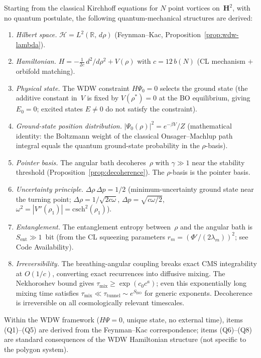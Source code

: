 \begin{derivation}
\label{thm:qm-from-polygons}
Starting from the classical Kirchhoff equations for
$N$ point vortices on~$\mathbf{H}^2$, with no quantum
postulate, the following quantum-mechanical structures
are derived:
\begin{enumerate}
\item[\textup{(Q1)}] \emph{Hilbert space.}
  $\mathcal{H} = L^2(\mathbb{R},\,d\rho)$
  (Feynman--Kac, Proposition~\ref{prop:wdw-lambda}).
\item[\textup{(Q2)}] \emph{Hamiltonian.}
  $H = -\tfrac{1}{2c}\,d^2/d\rho^2 + V(\rho)$
  with $c = 12\,b(N)$ (CL mechanism $+$ orbifold matching).
\item[\textup{(Q3)}] \emph{Physical state.}
  The WDW constraint $H\Psi_0 = 0$ selects the ground
  state (the additive constant in~$V$ is fixed by
  $V(\rho^*) = 0$ at the BO equilibrium, giving
  $E_0 = 0$; excited states $E \ne 0$ do not satisfy
  the constraint).
\item[\textup{(Q4)}] \emph{Ground-state position distribution.}
  $|\Psi_0(\rho)|^2 = e^{-\beta V}/Z$
  (mathematical identity: the Boltzmann weight of the
  classical Onsager--Machlup path integral equals the
  quantum ground-state probability in the $\rho$-basis).
\item[\textup{(Q5)}] \emph{Pointer basis.}
  The angular bath decoheres~$\rho$ with
  $\gamma \gg 1$ near the stability threshold
  (Proposition~\ref{prop:decoherence}).
  The $\rho$-basis is the pointer basis.
\item[\textup{(Q6)}] \emph{Uncertainty principle.}
  $\Delta\rho\,\Delta p = 1/2$ (minimum-uncertainty
  ground state near the turning point;
  $\Delta\rho = 1/\!\sqrt{2c\omega}$,
  $\Delta p = \sqrt{c\omega/2}$,
  $\omega^2 = |V''(\rho_1)| = \mathrm{csch}^2(\rho_1)$).
\item[\textup{(Q7)}] \emph{Entanglement.}
  The entanglement entropy between~$\rho$ and
  the angular bath is $S_{\mathrm{ent}} \gg 1$~bit
  (from the CL squeezing parameters
  $r_m = (\Phi'/(2\lambda_m))^2$;
  see Code Availability).
\item[\textup{(Q8)}] \emph{Irreversibility.}
  The breathing-angular coupling breaks exact CMS
  integrability at $O(1/c)$, converting exact
  recurrences into diffusive mixing.
  The Nekhoroshev bound gives
  $\tau_{\mathrm{mix}} \ge \exp(c_0 c^a)$;
  even this exponentially long mixing time satisfies
  $\tau_{\mathrm{mix}} \ll \tau_{\mathrm{tunnel}}
  \sim e^{S_{\mathrm{BO}}}$ for generic exponents.
  Decoherence is irreversible on all cosmologically
  relevant timescales.
\end{enumerate}
Within the WDW framework ($H\Psi = 0$, unique state,
no external time), items \textup{(Q1)--(Q5)} are derived
from the Feynman--Kac correspondence; items
\textup{(Q6)--(Q8)} are standard consequences of the
WDW Hamiltonian structure (not specific to the polygon
system).
\end{derivation}

